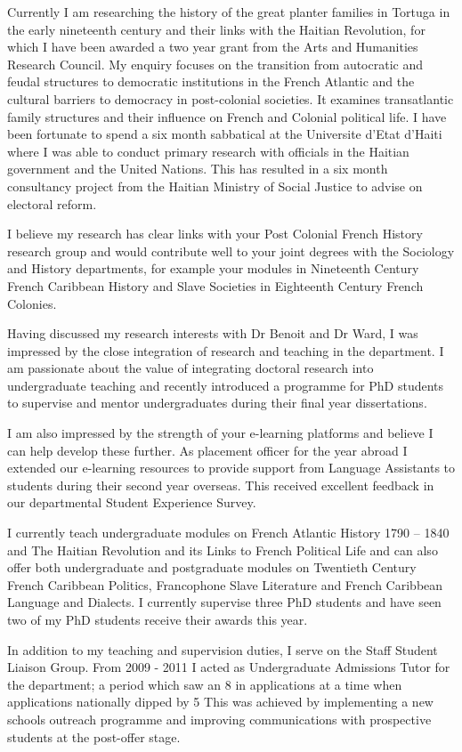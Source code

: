 \documentclass[]{cv} %
\begin{document}
Currently I am researching the history of the great planter families
in Tortuga in the early nineteenth century and their links with the
Haitian Revolution, for which I have been awarded a two year grant
from the Arts and Humanities Research Council. My enquiry focuses
on the transition from autocratic and feudal structures to democratic
institutions in the French Atlantic and the cultural barriers to democracy
in post-colonial societies. It examines transatlantic family structures
and their influence on French and Colonial political life. I have been
fortunate to spend a six month sabbatical at the Universite d’Etat d’Haiti
where I was able to conduct primary research with officials in the Haitian
government and the United Nations. This has resulted in a six month
consultancy project from the Haitian Ministry of Social Justice to advise
on electoral reform.

I believe my research has clear links with your Post Colonial French
History research group and would contribute well to your joint degrees
with the Sociology and History departments, for example your modules
in Nineteenth Century French Caribbean History and Slave Societies
in Eighteenth Century French Colonies.

Having discussed my research interests with Dr Benoit and Dr Ward,
I was impressed by the close integration of research and teaching in
the department. I am passionate about the value of integrating doctoral
research into undergraduate teaching and recently introduced a
programme for PhD students to supervise and mentor undergraduates
during their final year dissertations.

I am also impressed by the strength of your e-learning platforms and
believe I can help develop these further. As placement officer for the
year abroad I extended our e-learning resources to provide support
from Language Assistants to students during their second year
overseas. This received excellent feedback in our departmental
Student Experience Survey.

I currently teach undergraduate modules on French Atlantic History
1790 – 1840 and The Haitian Revolution and its Links to French
Political Life and can also offer both undergraduate and postgraduate
modules on Twentieth Century French Caribbean Politics, Francophone
Slave Literature and French Caribbean Language and Dialects. I currently
supervise three PhD students and have seen two of my PhD students
receive their awards this year.

In addition to my teaching and supervision duties, I serve on the Staff
Student Liaison Group. From 2009 - 2011 I acted as Undergraduate
Admissions Tutor for the department; a period which saw an 8%
in applications at a time when applications nationally dipped by 5%
This was achieved by implementing a new schools outreach programme
and improving communications with prospective students at the
post-offer stage.
\end{document}
